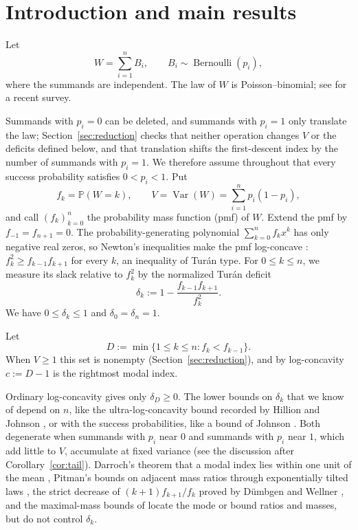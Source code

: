 \documentclass[ECP,preprint]{ejpecp}
\newcommand{\Pp}{\mathbb{P}}
\newcommand{\Var}{\operatorname{Var}}
\newcommand{\Ber}{\operatorname{Bernoulli}}
\begin{document}
\section{Introduction and main results}\label{sec:introduction}

Let
\[
  W=\sum_{i=1}^n B_i,
  \qquad B_i\sim\Ber(p_i),
\]
where the summands are independent. The law of $W$ is Poisson--binomial;
see \cite{tangtang2023} for a recent survey.

Summands with $p_i=0$ can be deleted, and summands with $p_i=1$ only
translate the law; Section~\ref{sec:reduction} checks that neither operation
changes $V$ or the deficits defined below, and that translation shifts the
first-descent index by the number of summands with $p_i=1$. We therefore assume throughout that
every success probability satisfies $0<p_i<1$. Put
\[
  f_k=\Pp(W=k),\qquad V=\Var(W)=\sum_{i=1}^n p_i(1-p_i),
\]
and call $(f_k)_{k=0}^n$ the probability mass function (pmf) of $W$. Extend
the pmf by $f_{-1}=f_{n+1}=0$. The probability-generating polynomial
$\sum_{k=0}^n f_kx^k$ has only negative real zeros, so Newton's inequalities
make the pmf log-concave \cite[equation~(1)]{pitman1997}: $f_k^2\geq
f_{k-1}f_{k+1}$ for every $k$, an inequality of Tur\'an type. For
$0\leq k\leq n$, we measure its slack relative to $f_k^2$ by the normalized
Tur\'an deficit
\begin{equation}\label{eq:deficit}
  \delta_k
  :=1-\frac{f_{k-1}f_{k+1}}{f_k^2}.
\end{equation}
We have $0\leq\delta_k\leq1$ and $\delta_0=\delta_n=1$.

Let
\begin{equation}\label{eq:first-descent}
  D:=\min\{1\leq k\leq n:f_k<f_{k-1}\}.
\end{equation}
When $V\geq1$ this set is nonempty (Section~\ref{sec:reduction}), and by
log-concavity $c:=D-1$ is the rightmost modal index.

Ordinary log-concavity gives only $\delta_D\geq0$. The lower bounds on
$\delta_k$ that we know of depend on $n$, like the ultra-log-concavity bound recorded by
Hillion and Johnson \cite{hillionjohnson2016}, or with the success
probabilities, like a bound of Johnson \cite{johnson2017discrete}. Both
degenerate when summands with $p_i$ near $0$ and summands with $p_i$ near $1$,
which add little to $V$, accumulate at fixed variance (see the discussion
after Corollary~\ref{cor:tail}). Darroch's theorem that a modal index lies
within one unit of the mean \cite{darroch1964}, Pitman's bounds on adjacent
mass ratios through exponentially tilted laws
\cite[equations~(20)--(21)]{pitman1997}, the strict decrease of
$(k+1)f_{k+1}/f_k$ proved by D\"umbgen and Wellner
\cite[Proposition~2]{duembgenwellner2020}, and the maximal-mass bounds of
\cite{bailloncominettivaisman2016,bobkovmarsigliettimelbourne2022} locate the
mode or bound ratios and masses, but do not control $\delta_k$.
\end{document}
